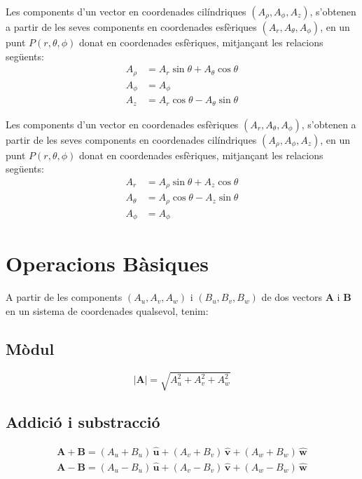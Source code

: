 \documentclass[catalan,a4paper,twoside,11pt]{article}
\begin{document}
Les components d'un vector en coordenades cilíndriques  $(A_\rho, A_\phi, A_z)$, s'obtenen a partir de les seves components en coordenades esfèriques $(A_r, A_\theta, A_\phi)$, en un punt $P(r,\theta,\phi)$ donat en coordenades esfèriques, mitjançant les relacions següents:
\begin{subequations}\begin{align}
    A_\rho &= A_r\sin\theta+A_\theta\cos\theta \\
    A_\phi &= A_\phi\\
    A_z &= A_r\cos\theta-A_\theta\sin\theta
\end{align}\end{subequations}

Les components d'un vector en coordenades esfèriques $(A_r, A_\theta, A_\phi)$, s'obtenen a partir de les seves components en coordenades cilíndriques $(A_\rho, A_\phi, A_z)$, en un punt $P(r,\theta,\phi)$ donat en coordenades esfèriques, mitjançant les relacions següents:
\begin{subequations}\begin{align}
    A_r &=  A_\rho\sin\theta+A_z\cos\theta\\
    A_\theta &=  A_\rho\cos\theta-A_z\sin\theta\\
    A_\phi &= A_\phi
\end{align}\end{subequations}


\section{Operacions  Bàsiques}
\renewcommand{\va}{\ensuremath{\,\boldsymbol{\hat{u}}}}
\renewcommand{\vb}{\ensuremath{\,\boldsymbol{\hat{v}}}}
\renewcommand{\vc}{\ensuremath{\,\boldsymbol{\hat{w}}}}

A partir de les components $(A_u,A_v,A_w)$ i $(B_u,B_v,B_w)$
de dos vectors $\boldsymbol{A}$ i $\boldsymbol{B}$ en un sistema de coordenades qualsevol, tenim:

\subsection{Mòdul}
\vspace{-5mm}
\begin{equation}
    |\boldsymbol{A}|=  \sqrt{A_u^2 + A_v^2 + A_w^2}
\end{equation}

\subsection{Addició i substracció}
\vspace{-5mm}
\begin{subequations}\begin{align}
    \boldsymbol{A+B}= (A_u+B_u)\va + (A_v+B_v)\vb + (A_w+B_w)\vc \\
    \boldsymbol{A-B}= (A_u-B_u)\va + (A_v-B_v)\vb + (A_w-B_w)\vc
\end{align}\end{subequations}
\end{document}
